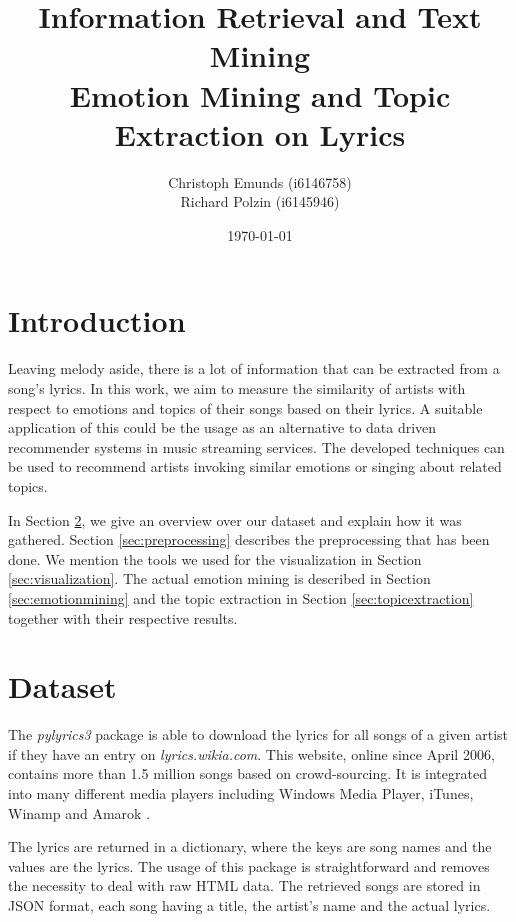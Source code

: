 \documentclass[10pt,a4paper]{article}
\author{Christoph Emunds (i6146758)\\Richard Polzin (i6145946)}
\title{Information Retrieval and Text Mining\\Emotion Mining and Topic Extraction on Lyrics}
\date{\today}
\begin{document}
	\maketitle
	
	\tableofcontents
	
	\section{Introduction}
	\label{sec:introduction}
	Leaving melody aside, there is a lot of information that can be extracted from a song's lyrics. In this work, we aim to measure the similarity of artists with respect to emotions and topics of their songs based on their lyrics. A suitable application of this could be the usage as an alternative to data driven recommender systems in music streaming services. The developed techniques can be used to recommend artists invoking similar emotions or singing about related topics.
	
	In Section \ref{sec:dataset}, we give an overview over our dataset and explain how it was gathered. Section \ref{sec:preprocessing} describes the preprocessing that has been done. We mention the tools we used for the visualization in Section \ref{sec:visualization}. The actual emotion mining is described in Section \ref{sec:emotionmining} and the topic extraction in Section \ref{sec:topicextraction} together with their respective results.

	\section{Dataset}
	\label{sec:dataset}

	The \textit{pylyrics3} package \cite{pylyrics3} is able to download the lyrics for all songs of a given artist if they have an entry on \textit{lyrics.wikia.com}. This website, online since April 2006, contains more than 1.5 million songs based on crowd-sourcing. It is integrated into many different media players including Windows Media Player, iTunes, Winamp and Amarok \cite{lyricwikia}.
	
	The lyrics are returned in a dictionary, where the keys are song names and the values are the lyrics. The usage of this package is straightforward and removes the necessity to deal with raw HTML data. The retrieved songs are stored in JSON format, each song having a title, the artist's name and the actual lyrics.
	
\end{document}
